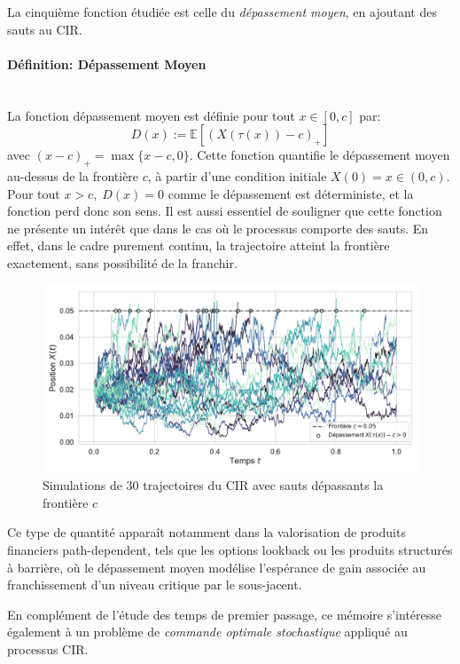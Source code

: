 La cinquième fonction étudiée est celle du \textit{dépassement moyen}, en ajoutant des sauts au \acs{CIR}.
\paragraph{Définition: Dépassement Moyen}\mbox{}\\
La fonction dépassement moyen est définie pour tout \(x\in[0,c]\) par: 
\begin{equation}\label{overshoot}
    D(x):=\mathds{E}\left[{(X(\tau(x))-c)}_+\right]
\end{equation}
avec \({(x-c)}_+=\max\{x-c,0\}\).
Cette fonction quantifie le dépassement moyen au-dessus de la frontière \(c\), à partir d'une condition initiale \(X(0)=x\in(0,c)\). Pour tout \(x>c,\;D(x)=0\) comme le dépassement est déterministe, et la fonction perd donc son sens. Il est aussi essentiel de souligner que cette fonction ne présente un intérêt que dans le cas où le processus comporte des sauts. En effet, dans le cadre purement continu, la trajectoire atteint la frontière exactement, sans possibilité de la franchir.
\begin{figure}[htb]
    \centering
    \includegraphics[width=0.9\linewidth]{img/intro/overshoot.pdf}
    \caption{Simulations de 30 trajectoires du \acs{CIR} avec sauts dépassants la frontière $c$}\label{fig:OvershootViz}
\end{figure}
\FloatBarrier Ce type de quantité apparaît notamment dans la valorisation de produits financiers path-dependent, tels que les options lookback ou les produits structurés à barrière, où le dépassement moyen modélise l'espérance de gain associée au franchissement d'un niveau critique par le sous-jacent. 

En complément de l'étude des temps de premier passage, ce mémoire s'intéresse également à un problème de \textit{commande optimale stochastique} appliqué au processus \acs{CIR}.
